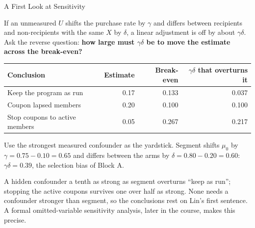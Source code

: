 \documentclass[aspectratio=169, 11pt, handout]{beamer}
\begin{document}
\begin{frame}{A First Look at Sensitivity}

If an unmeasured $U$ shifts the purchase rate by $\gamma$ and differs between recipients and non-recipients with the same $X$ by $\delta$, a linear adjustment is off by about $\gamma\delta$. Ask the reverse question: \textbf{how large must $\gamma\delta$ be to move the estimate across the break-even?}

\begin{center}
\small
\begin{tabular}{lrrr}
\toprule
\textbf{Conclusion} & \textbf{Estimate} & \textbf{Break-even} & \textbf{$\gamma\delta$ that overturns it} \\
\midrule
Keep the program as run & 0.17 & 0.133 & 0.037 \\
Coupon lapsed members & 0.20 & 0.100 & 0.100 \\
Stop coupons to active members & 0.05 & 0.267 & 0.217 \\
\bottomrule
\end{tabular}
\end{center}

Use the strongest measured confounder as the yardstick. Segment shifts $\mu_0$ by $\gamma = 0.75 - 0.10 = 0.65$ and differs between the arms by $\delta = 0.80 - 0.20 = 0.60$: $\gamma\delta = 0.39$, the selection bias of Block A.

\medskip

A hidden confounder a tenth as strong as segment overturns ``keep as run''; stopping the active coupons survives one over half as strong. None needs a confounder stronger than segment, so the conclusions rest on Lin's first sentence. A formal omitted-variable sensitivity analysis, later in the course, makes this precise.
\end{frame}
\end{document}
